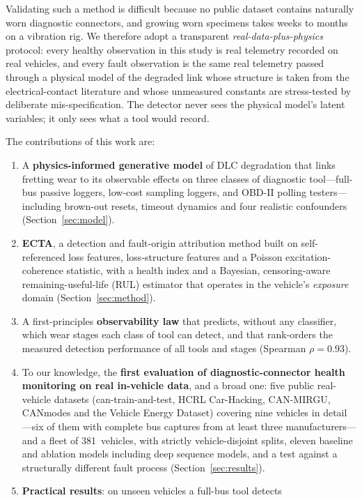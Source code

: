 Validating such a method is difficult because no public dataset contains
naturally worn diagnostic connectors, and growing worn specimens takes
weeks to months on a vibration rig. We therefore adopt a transparent
\emph{real-data-plus-physics} protocol: every healthy observation in this
study is real telemetry recorded on real vehicles, and every fault
observation is the same real telemetry passed through a physical model of
the degraded link whose structure is taken from the electrical-contact
literature and whose unmeasured constants are stress-tested by deliberate
mis-specification. The detector never sees the physical model's latent
variables; it only sees what a tool would record.

The contributions of this work are:
\begin{enumerate}
\item A \textbf{physics-informed generative model} of DLC degradation that
  links fretting wear to its observable effects on three classes of
  diagnostic tool---full-bus passive loggers, low-cost sampling loggers, and
  OBD-II polling testers---including brown-out resets, timeout dynamics and
  four realistic confounders (Section~\ref{sec:model}).
\item \textbf{ECTA}, a detection and fault-origin attribution method built on
  self-referenced loss features, loss-structure features and a Poisson
  excitation-coherence statistic, with a health index and a Bayesian,
  censoring-aware remaining-useful-life (RUL) estimator that operates in the
  vehicle's \emph{exposure} domain (Section~\ref{sec:method}).
\item A first-principles \textbf{observability law} that predicts, without
  any classifier, which wear stages each class of tool can detect, and that
  rank-orders the measured detection performance of all tools and stages
  (Spearman $\rho=0.93$).
\item To our knowledge, the \textbf{first evaluation of diagnostic-connector
  health monitoring on real in-vehicle data}, and a broad one: five public real-vehicle datasets (can-train-and-test,
  HCRL Car-Hacking, CAN-MIRGU, CANmodes and the Vehicle Energy Dataset)
  covering nine vehicles in detail---six of them with complete
  bus captures from at least three manufacturers---and a fleet of 381~vehicles, with
  strictly vehicle-disjoint splits, eleven baseline and ablation models
  including deep sequence models, and a test against a structurally
  different fault process (Section~\ref{sec:results}).
\item \textbf{Practical results}: on unseen vehicles a full-bus tool detects

\end{enumerate}
